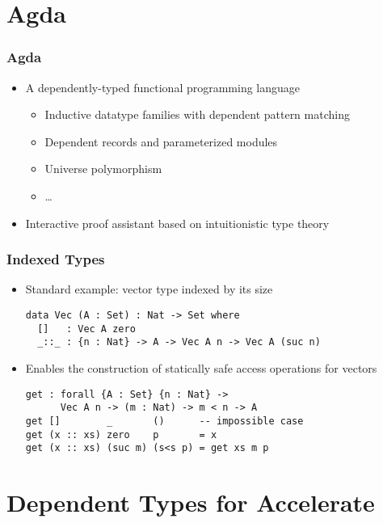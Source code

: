 \documentclass{beamer}
\begin{document}
\section{Agda}
\begin{frame}
  \frametitle{Agda}
  \begin{itemize}
  \item A dependently-typed functional programming language
    \begin{itemize}
    \item Inductive datatype families with dependent pattern matching
    \item Dependent records and parameterized modules
    \item Universe polymorphism
    \item \dots
    \end{itemize}
  \item Interactive proof assistant based on intuitionistic type theory
  \end{itemize}
\end{frame}

\begin{frame}[fragile]
  \frametitle{Indexed Types}
  \begin{itemize}
  \item Standard example: vector type indexed by its size
\begin{verbatim}
data Vec (A : Set) : Nat -> Set where
  []   : Vec A zero
  _::_ : {n : Nat} -> A -> Vec A n -> Vec A (suc n)
\end{verbatim}
  \item<2-> Enables the construction of statically safe access operations
    for vectors
\begin{verbatim}
get : forall {A : Set} {n : Nat} ->
      Vec A n -> (m : Nat) -> m < n -> A
get []        _       ()      -- impossible case
get (x :: xs) zero    p       = x
get (x :: xs) (suc m) (s<s p) = get xs m p
\end{verbatim}
  \end{itemize}
\end{frame}

\section{Dependent Types for Accelerate}
\end{document}
